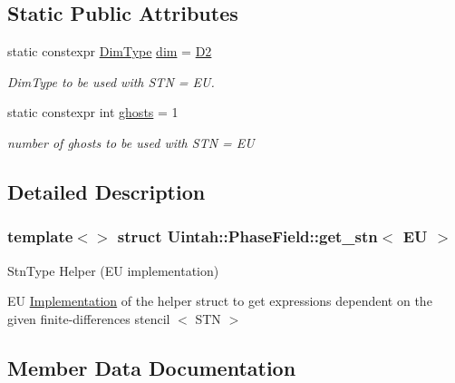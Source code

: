 \subsection*{Static Public Attributes}
\begin{DoxyCompactItemize}
\item 
static constexpr \hyperlink{namespaceUintah_1_1PhaseField_a12bfc68444894dffdf0cb8d9cf0cc76a}{Dim\+Type} \hyperlink{structUintah_1_1PhaseField_1_1get__stn_3_01EU_01_4_a449d31ffcd7d8579bf6e4c10237f4e75}{dim} = \hyperlink{namespaceUintah_1_1PhaseField_a12bfc68444894dffdf0cb8d9cf0cc76aa1a451dae278b0103a94105c8776e9a67}{D2}
\begin{DoxyCompactList}\small\item\em Dim\+Type to be used with S\+TN = EU. \end{DoxyCompactList}\item 
static constexpr int \hyperlink{structUintah_1_1PhaseField_1_1get__stn_3_01EU_01_4_a9539e5e243f41b0655de0b67be85dfc7}{ghosts} = 1
\begin{DoxyCompactList}\small\item\em number of ghosts to be used with S\+TN = EU \end{DoxyCompactList}\end{DoxyCompactItemize}


\subsection{Detailed Description}
\subsubsection*{template$<$$>$\newline
struct Uintah\+::\+Phase\+Field\+::get\+\_\+stn$<$ E\+U $>$}

Stn\+Type Helper (EU implementation) 

EU \hyperlink{classUintah_1_1PhaseField_1_1Implementation}{Implementation} of the helper struct to get expressions dependent on the given finite-\/differences stencil $<$ S\+TN $>$ 

\subsection{Member Data Documentation}
\mbox{\label{structUintah_1_1PhaseField_1_1get__stn_3_01EU_01_4_a449d31ffcd7d8579bf6e4c10237f4e75}} 
